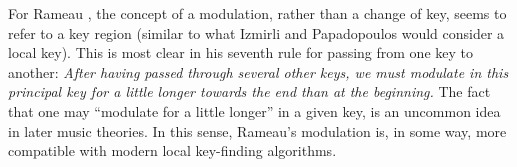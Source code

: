 For Rameau \cite{rameau_treatise_1971}, the concept of a modulation, rather than a change of key, seems to refer to a key region (similar to what Izmirli and Papadopoulos would consider a local key). This is most clear in his seventh rule for passing from one key to another: \emph{After having passed through several other keys, we must modulate in this principal key for a little longer towards the end than at the beginning.} The fact that one may ``modulate for a little longer'' in a given key, is an uncommon idea in later music theories. In this sense, Rameau's modulation is, in some way, more compatible with modern local key-finding algorithms.













